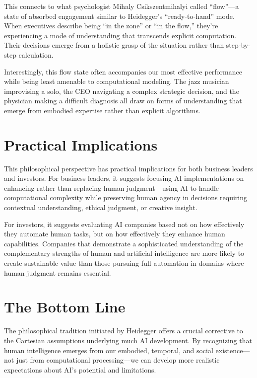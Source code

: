 \documentclass[
  Letterpaper,
]{scrbook}
\begin{document}
This connects to what psychologist Mihaly Csikszentmihalyi called
``flow''---a state of absorbed engagement similar to Heidegger's
``ready-to-hand'' mode. When executives describe being ``in the zone''
or ``in the flow,'' they're experiencing a mode of understanding that
transcends explicit computation. Their decisions emerge from a holistic
grasp of the situation rather than step-by-step calculation.

Interestingly, this flow state often accompanies our most effective
performance while being least amenable to computational modeling. The
jazz musician improvising a solo, the CEO navigating a complex strategic
decision, and the physician making a difficult diagnosis all draw on
forms of understanding that emerge from embodied expertise rather than
explicit algorithms.

\section{Practical Implications}\label{practical-implications}

This philosophical perspective has practical implications for both
business leaders and investors. For business leaders, it suggests
focusing AI implementations on enhancing rather than replacing human
judgment---using AI to handle computational complexity while preserving
human agency in decisions requiring contextual understanding, ethical
judgment, or creative insight.

For investors, it suggests evaluating AI companies based not on how
effectively they automate human tasks, but on how effectively they
enhance human capabilities. Companies that demonstrate a sophisticated
understanding of the complementary strengths of human and artificial
intelligence are more likely to create sustainable value than those
pursuing full automation in domains where human judgment remains
essential.

\section{The Bottom Line}\label{the-bottom-line}

The philosophical tradition initiated by Heidegger offers a crucial
corrective to the Cartesian assumptions underlying much AI development.
By recognizing that human intelligence emerges from our embodied,
temporal, and social existence---not just from computational
processing---we can develop more realistic expectations about AI's
potential and limitations.
\end{document}
